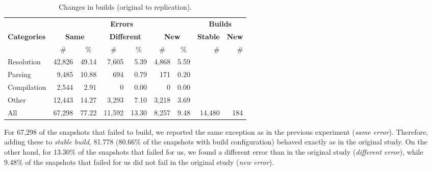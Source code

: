\begin{table}[]
\caption{Changes in builds (original to replication).}
\label{table:causesDetailed}
\centering
\begin{tabular}{l|rrrrrr|rr}
  \toprule
  & \multicolumn{6}{c|}{\bf{Errors}} & \multicolumn{2}{c}{\bf{Builds}} \\ 
   \multicolumn{1}{l|}{\bf{Categories}} & \multicolumn{2}{c}{\bf{Same}} & \multicolumn{2}{c}{\bf{Different}} & \multicolumn{2}{c|}{\bf{ New}} & \bf{Stable} & \bf{New} \\
 & \multicolumn{1}{c}{\#} & \multicolumn{1}{c}{\%} & \multicolumn{1}{c}{\#} & \multicolumn{1}{c}{\%} & \multicolumn{1}{c}{\#} & \multicolumn{1}{c|}{\%} & \# & \# \\
\midrule
Resolution             & 42,826                  & 49.14                   & 7,605                   & 5.39                    & 4,868                   & 5.59                    \\
Parsing                & 9,485                   & 10.88                   & 694                     & 0.79                    & 171                     & 0.20                    \\
Compilation            & 2,544                   &  2.91                   & 0                       & 0.00                    & 0                       & 0.00                    \\
Other                  & 12,443                  & 14.27                   & 3,293                   & 7.10                    & 3,218                   & 3.69                    \\
\midrule
All  & 67,298 & 77.22 & 11,592 & 13.30 & 8,257 & 9.48 & 14,480 & 184 \\ 
\bottomrule
\end{tabular}
\end{table}

\renewcommand{\tabcolsep}{6pt}

For 67,298 of the snapshots that failed to build, we reported the same exception as in the previous experiment (\textit{same error}). Therefore, adding these to \textit{stable build}, 81.778 (80.66\% of the snapshots with build configuration) behaved exactly as in the original study. On the other hand, for 13.30\% of the snapshots that failed for us, we found a different error than in the original study (\textit{different error}), while 9.48\% of the snapshots that failed for us did not fail in the original study (\textit{new error}).

